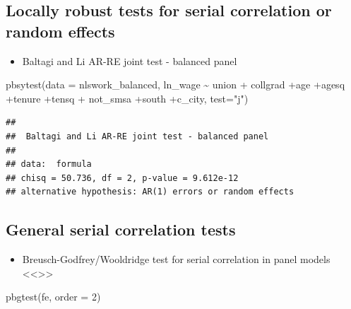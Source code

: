 \documentclass[
]{article}
\newenvironment{Shaded}{\begin{snugshade}}{\end{snugshade}}
\newcommand{\AttributeTok}[1]{\textcolor[rgb]{0.77,0.63,0.00}{#1}}
\newcommand{\DecValTok}[1]{\textcolor[rgb]{0.00,0.00,0.81}{#1}}
\newcommand{\FunctionTok}[1]{\textcolor[rgb]{0.00,0.00,0.00}{#1}}
\newcommand{\NormalTok}[1]{#1}
\newcommand{\SpecialCharTok}[1]{\textcolor[rgb]{0.00,0.00,0.00}{#1}}
\newcommand{\StringTok}[1]{\textcolor[rgb]{0.31,0.60,0.02}{#1}}
\providecommand{\tightlist}{%
  \setlength{\itemsep}{0pt}\setlength{\parskip}{0pt}}
\begin{document}
\hypertarget{locally-robust-tests-for-serial-correlation-or-random-effects}{%
\subsection{Locally robust tests for serial correlation or random
effects}\label{locally-robust-tests-for-serial-correlation-or-random-effects}}

\begin{itemize}
\tightlist
\item
  Baltagi and Li AR-RE joint test - balanced panel
\end{itemize}

\begin{Shaded}
\begin{Highlighting}[]
  \FunctionTok{pbsytest}\NormalTok{(}\AttributeTok{data =}\NormalTok{ nlswork\_balanced, ln\_wage }\SpecialCharTok{\textasciitilde{}}\NormalTok{ union }\SpecialCharTok{+}
\NormalTok{             collgrad }\SpecialCharTok{+}\NormalTok{age }\SpecialCharTok{+}\NormalTok{agesq }\SpecialCharTok{+}\NormalTok{tenure }\SpecialCharTok{+}\NormalTok{tensq }\SpecialCharTok{+}
\NormalTok{             not\_smsa }\SpecialCharTok{+}\NormalTok{south }\SpecialCharTok{+}\NormalTok{c\_city, }\AttributeTok{test=}\StringTok{"j"}\NormalTok{)}
\end{Highlighting}
\end{Shaded}

\begin{verbatim}
## 
##  Baltagi and Li AR-RE joint test - balanced panel
## 
## data:  formula
## chisq = 50.736, df = 2, p-value = 9.612e-12
## alternative hypothesis: AR(1) errors or random effects
\end{verbatim}

\hypertarget{general-serial-correlation-tests}{%
\subsection{General serial correlation
tests}\label{general-serial-correlation-tests}}

\begin{itemize}
\tightlist
\item
  Breusch-Godfrey/Wooldridge test for serial correlation in panel models
  \textless\textless\textgreater\textgreater{}
\end{itemize}

\begin{Shaded}
\begin{Highlighting}[]
\FunctionTok{pbgtest}\NormalTok{(fe, }\AttributeTok{order =} \DecValTok{2}\NormalTok{)}
\end{Highlighting}
\end{Shaded}
\end{document}
